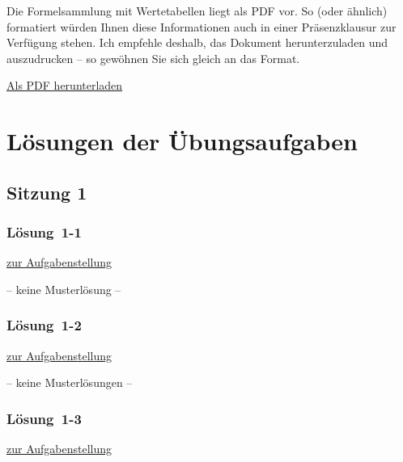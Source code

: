 \documentclass[
  11pt,
  ngerman,
  a4paper,
]{report}
\begin{document}
Die Formelsammlung mit Wertetabellen liegt als PDF vor. So (oder ähnlich) formatiert würden Ihnen diese Informationen auch in einer Präsenzklausur zur Verfügung stehen. Ich empfehle deshalb, das Dokument herunterzuladen und auszudrucken -- so gewöhnen Sie sich gleich an das Format.

\href{Formelsammlung\%20und\%20Wertetabellen.pdf}{Als PDF herunterladen}

\hypertarget{luxf6sungen-der-uxfcbungsaufgaben}{%
\chapter*{Lösungen der Übungsaufgaben}\label{luxf6sungen-der-uxfcbungsaufgaben}}

\hypertarget{sitzung-1}{%
\section*{Sitzung 1}\label{sitzung-1}}

\hypertarget{loesung-1-1}{%
\subsection{Lösung~1-1}\label{loesung-1-1}}

\protect\hyperlink{aufgabe-1-1}{zur Aufgabenstellung}

-- keine Musterlösung --

\hypertarget{loesung-1-2}{%
\subsection{Lösung~1-2}\label{loesung-1-2}}

\protect\hyperlink{aufgabe-1-2}{zur Aufgabenstellung}

-- keine Musterlösungen --

\hypertarget{loesung-1-3}{%
\subsection{Lösung~1-3}\label{loesung-1-3}}

\protect\hyperlink{aufgabe-1-3}{zur Aufgabenstellung}
\end{document}
